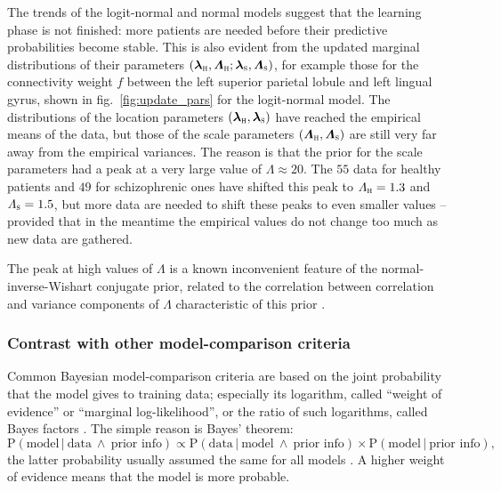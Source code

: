 \documentclass[%
]{frontiersSCNS-nologo} %
\newcommand*{\chaps}{chs} %
\newcommand*{\fig}{fig.} %
\newcommand*{\eg}{e.g.}
\newcommand*{\p}{\mathrm{P}}%
\renewcommand*{\|}{\mathpunct{|}}%
\newcommand*{\Land}{\mathbin{\ \land\ }}
\newcommand*{\Cond}{\mathpunct{\,|\ }}%
\newcommand*{\yhu}{\textsc{h}}
\newcommand*{\yhd}{\textsc{s}}
\newcommand*{\yxx}{f}
\newcommand*{\ylm}{\lambda}
\newcommand*{\ylmm}{\bm{\ylm}}
\newcommand*{\yls}{\varLambda}
\newcommand*{\ylss}{\bm{\yls}}
\begin{document}
The trends of the logit-normal and normal models suggest that the learning
phase is not finished: more patients are needed before their predictive
probabilities become stable. This is also evident from the updated marginal
distributions of their parameters
$(\ylmm_{\yhu},\ylss_{\yhu} ; \ylmm_{\yhd},\ylss_{\yhd})$, for example
those for the connectivity weight $\yxx$ between the left superior parietal
lobule and left lingual gyrus, shown in \fig~\ref{fig:update_pars} for the
logit-normal model. The distributions of the location parameters
$(\ylmm_{\yhu},\ylmm_{\yhd})$ have reached the empirical means of the data,
but those of the scale parameters $(\ylss_{\yhu}, \ylss_{\yhd})$ are still
very far away from the empirical variances. The reason is that the prior
for the scale parameters had a peak at a very large value of
$\yls\approx 20$. The $55$ data for healthy patients and $49$ for
schizophrenic ones have shifted this peak to $\yls_{\yhu} = 1.3$ and
$\yls_{\yhd} = 1.5$, but more data are needed to shift these peaks to even
smaller values -- provided that in the meantime the empirical values do not
change too much as new data are gathered.

The peak at high values of $\ylss$ is a known inconvenient feature of the
normal-inverse-Wishart conjugate prior, related to the correlation between
correlation and variance components of $\ylss$ characteristic of this prior
\citep[\eg][]{barnardetal2000}.

\subsubsection{Contrast with other model-comparison criteria}
\label{sec:variance_bayes_factors}

Common Bayesian model-comparison criteria are based on the joint
probability that the model gives to training data; especially its
logarithm, called \enquote{weight of evidence} or \enquote{marginal
  log-likelihood}, or the ratio of such logarithms, called Bayes factors
\citetext{\citealp[\chaps~V, VI, A]{jeffreys1939_r2003};
  \citealp{good1950,mackay1992,kassetal1995}}. The simple reason is Bayes' theorem:
\begin{equation}
  \label{eq:explain_model_probability}
  \p(\text{model} \Cond \text{data} \Land \text{prior info} ) \propto
  \p(\text{data} \Cond \text{model} \Land \text{prior info}) \times
  \p(\text{model} \Cond \text{prior info} ),
\end{equation}
the latter probability usually assumed the same for all models \citep[but
see][]{portamana2018}. A higher weight of evidence means that the model is
more probable.
\end{document}
